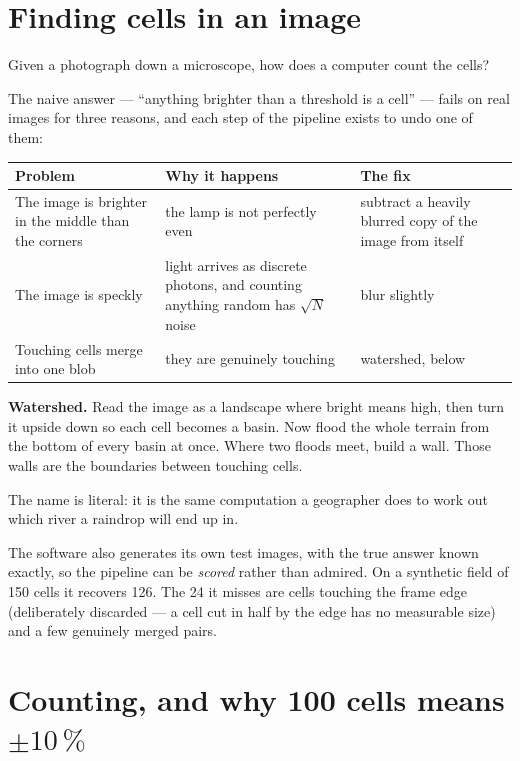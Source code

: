 \documentclass[11pt,a4paper]{article}
\begin{document}
\section{Finding cells in an image}

Given a photograph down a microscope, how does a computer count the cells?

The naive answer --- ``anything brighter than a threshold is a cell'' ---
fails on real images for three reasons, and each step of the pipeline exists to
undo one of them:

\begin{center}\small
\begin{tabular}{p{4.6cm}p{5.0cm}p{5.0cm}}
\toprule
\textbf{Problem} & \textbf{Why it happens} & \textbf{The fix} \\
\midrule
The image is brighter in the middle than the corners &
the lamp is not perfectly even &
subtract a heavily blurred copy of the image from itself \\[4pt]
The image is speckly &
light arrives as discrete photons, and counting anything random has
$\sqrt{N}$ noise &
blur slightly \\[4pt]
Touching cells merge into one blob &
they are genuinely touching &
watershed, below \\
\bottomrule
\end{tabular}
\end{center}

\begin{analogy}
\textbf{Watershed.} Read the image as a landscape where bright means high, then
turn it upside down so each cell becomes a basin. Now flood the whole terrain
from the bottom of every basin at once. Where two floods meet, build a wall.
Those walls are the boundaries between touching cells.

The name is literal: it is the same computation a geographer does to work out
which river a raindrop will end up in.
\end{analogy}

The software also generates its own test images, with the true answer known
exactly, so the pipeline can be \emph{scored} rather than admired. On a
synthetic field of 150 cells it recovers 126. The 24 it misses are cells
touching the frame edge (deliberately discarded --- a cell cut in half by the
edge has no measurable size) and a few genuinely merged pairs.

\section{Counting, and why 100 cells means $\pm10\,\%$}
\end{document}
